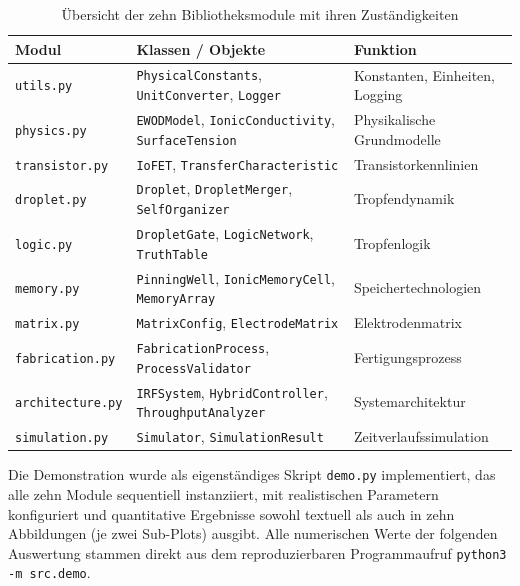 ﻿\documentclass[a4paper,12pt]{scrreprt}
\theoremstyle{definition}
\begin{document}
\begin{table}
	\centering
	\caption{Übersicht der zehn Bibliotheksmodule mit ihren Zuständigkeiten}
	\label{tab:module_overview}
	\begin{tabular}{lll}
		\toprule
		\textbf{Modul} & \textbf{Klassen / Objekte} & \textbf{Funktion} \\
		\midrule
		\texttt{utils.py}        & \texttt{PhysicalConstants}, \texttt{UnitConverter}, \texttt{Logger} & Konstanten, Einheiten, Logging \\
		\texttt{physics.py}      & \texttt{EWODModel}, \texttt{IonicConductivity}, \texttt{SurfaceTension} & Physikalische Grundmodelle \\
		\texttt{transistor.py}   & \texttt{IoFET}, \texttt{TransferCharacteristic} & Transistorkennlinien \\
		\texttt{droplet.py}      & \texttt{Droplet}, \texttt{DropletMerger}, \texttt{SelfOrganizer} & Tropfendynamik \\
		\texttt{logic.py}        & \texttt{DropletGate}, \texttt{LogicNetwork}, \texttt{TruthTable} & Tropfenlogik \\
		\texttt{memory.py}       & \texttt{PinningWell}, \texttt{IonicMemoryCell}, \texttt{MemoryArray} & Speichertechnologien \\
		\texttt{matrix.py}       & \texttt{MatrixConfig}, \texttt{ElectrodeMatrix} & Elektrodenmatrix \\
		\texttt{fabrication.py}  & \texttt{FabricationProcess}, \texttt{ProcessValidator} & Fertigungsprozess \\
		\texttt{architecture.py} & \texttt{IRFSystem}, \texttt{HybridController}, \texttt{ThroughputAnalyzer} & Systemarchitektur \\
		\texttt{simulation.py}   & \texttt{Simulator}, \texttt{SimulationResult} & Zeitverlaufssimulation \\
		\bottomrule
	\end{tabular}
\end{table}

Die Demonstration wurde als eigenständiges Skript \texttt{demo.py} implementiert,
das alle zehn Module sequentiell instanziiert, mit realistischen Parametern
konfiguriert und quantitative Ergebnisse sowohl textuell als auch in zehn
Abbildungen (je zwei Sub-Plots) ausgibt. Alle numerischen Werte der folgenden
Auswertung stammen direkt aus dem reproduzierbaren Programmaufruf
\texttt{python3 -m src.demo}.

\end{document}

